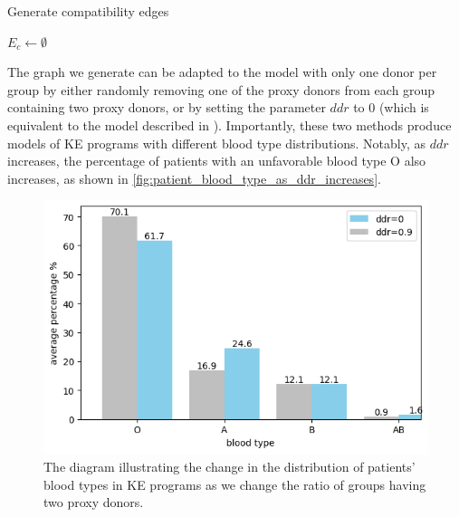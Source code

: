 \begin{algorithm}
    \caption{Generate compatibility edges}
    \label{alg:generate_compatibility_edges}


    $E_c \gets \emptyset$\;

\end{algorithm}

The graph we generate can be adapted to the model with only one donor per group by either randomly removing one of the proxy donors from each group containing two proxy donors, or by setting the parameter $ddr$ to $0$ (which is equivalent to the model described in \cite{toulis2011random}). Importantly, these two methods produce models of KE programs with different blood type distributions. Notably, as $ddr$ increases, the percentage of patients with an unfavorable blood type O also increases, as shown in \autoref{fig:patient_blood_type_as_ddr_increases}.

\begin{figure}[H]
    \centering
    \includegraphics[width=1.\linewidth]{data/patient_blood_type_as_ddr_increases.png}
    \caption[Distribution of patients' blood types as double donor ratio changes]{The diagram illustrating the change in the distribution of patients' blood types in KE programs as we change the ratio of groups having two proxy donors.}
    \label{fig:patient_blood_type_as_ddr_increases}
\end{figure}


